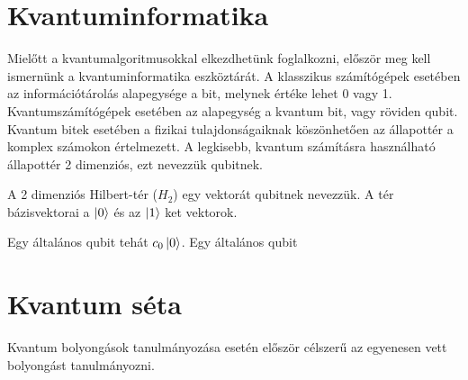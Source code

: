 \chapter{Kvantuminformatika}

Mielőtt a kvantumalgoritmusokkal elkezdhetünk foglalkozni, először meg kell ismernünk
a kvantuminformatika eszköztárát. A klasszikus számítógépek esetében az információtárolás
alapegysége a bit, melynek értéke lehet 0 vagy 1. Kvantumszámítógépek esetében az alapegység a kvantum bit, vagy röviden qubit. Kvantum bitek esetében a fizikai
tulajdonságaiknak köszönhetően az állapottér a komplex számokon értelmezett.
A legkisebb, kvantum számításra használható állapottér 2 dimenziós, ezt nevezzük qubitnek.

 A 2 dimenziós Hilbert-tér ($H_2$) egy vektorát qubitnek nevezzük. A tér bázisvektorai a $\ket{0}$ és az $\ket{1}$ ket vektorok.

Egy általános qubit tehát $c_0\ket{0}$.
 Egy általános qubit






\chapter{Kvantum séta}

Kvantum bolyongások tanulmányozása esetén először célszerű az egyenesen
vett bolyongást tanulmányozni.

